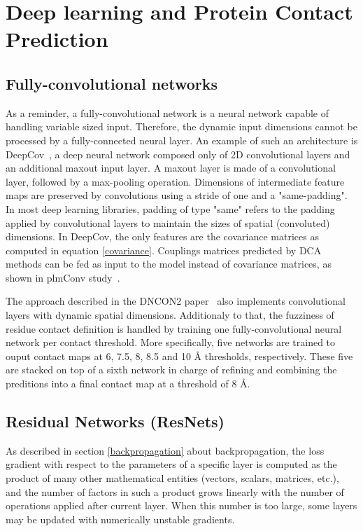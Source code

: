 \section{Deep learning and Protein Contact Prediction}

    \subsection{Fully-convolutional networks}

        As a reminder, a fully-convolutional network is a neural network capable
        of handling variable sized input. Therefore, the dynamic input dimensions
        cannot be processed by a fully-connected neural layer.
        An example of such an architecture is DeepCov~\cite{doi:10.1093/bioinformatics/bty341},
        a deep neural network composed only of 2D convolutional layers and an additional
        maxout input layer. A maxout layer is made of a convolutional layer, followed
        by a max-pooling operation. Dimensions of intermediate feature maps are preserved
        by convolutions using a stride of one and a "same-padding". In most deep learning
        libraries, padding of type "same" refers to the padding applied by convolutional layers
        to maintain the sizes of spatial (convoluted) dimensions.
        In DeepCov, the only features are the covariance matrices as computed
        in equation \ref{covariance}. Couplings matrices predicted by DCA methods can be fed as
        input to the model instead of covariance matrices, as shown in plmConv study~\cite{golkov2016protein}.

        The approach described in the DNCON2 paper~\cite{doi:10.1093/bioinformatics/bty341}
        also implements convolutional layers with dynamic spatial dimensions.
        Additionaly to that, the fuzziness of residue contact definition is handled
        by training one fully-convolutional neural network per contact threshold.
        More specifically, five networks are trained to ouput contact maps at 6, 7.5, 8, 8.5 and 10 \AA{}
        thresholds, respectively. These five are stacked on top of a sixth network in charge
        of refining and combining the preditions into a final contact map at a threshold of 8 \AA{}.

    \subsection{Residual Networks (ResNets)}

        As described in section \ref{backpropagation} about backpropagation,
        the loss gradient with respect to the parameters of a specific layer
        is computed as the product of many other mathematical entities
        (vectors, scalars, matrices, etc.), and the number of factors in such
        a product grows linearly with the number of operations applied after
        current layer. When this number is too large, some layers may be
        updated with numerically unstable gradients.

